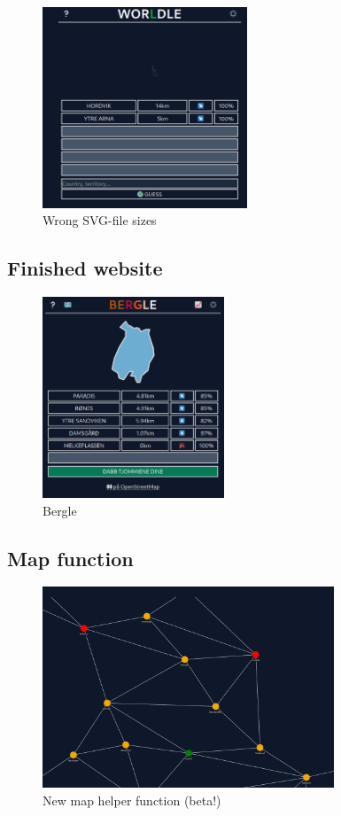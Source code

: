 \begin{frame}
    \begin{figure}
        \centering
        \includegraphics[height = 6cm]{images/svg_toosmall.png}%
        \caption{Wrong SVG-file sizes}
    \end{figure}
\end{frame}

\subsection{Finished website}
\begin{frame}
    \begin{figure}
        \centering
        \includegraphics[height = 6cm]{images/bergleFinal.png}%
        \caption{Bergle}
    \end{figure}
\end{frame}

\subsection{Map function}
\begin{frame}
    \begin{figure}
        \centering
        \includegraphics[height = 6cm]{images/map.png}%
        \caption{New map helper function (beta!)}
    \end{figure}
\end{frame}

